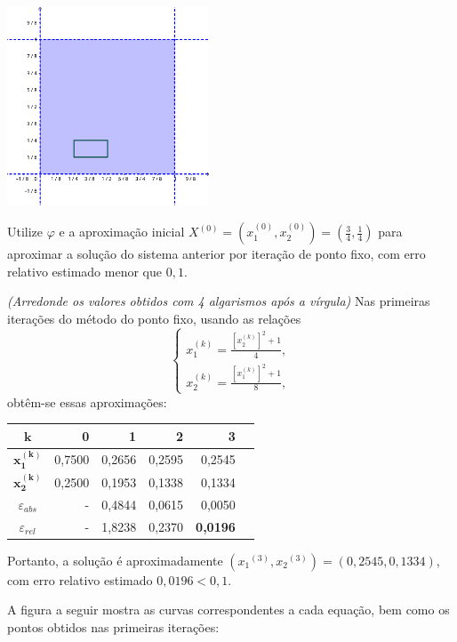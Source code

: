 \documentclass[12pt,a4paper]{article}
\begin{document}
\begin{ExerciseList}
\begin{center}
  \includegraphics[width=6.0cm]{img/5-sistema-não-linear-2x2-iteração-ponto-fixo.pdf}
\end{center}

\Exercise[title={2,0}] Utilize $\varphi$ e a aproximação inicial $X^{(0)}=(x_1^{(0)}, x_2^{(0)}) = (\frac{3}{4}, \frac{1}{4})$ para aproximar a solução do sistema anterior por iteração de ponto fixo, com erro relativo estimado menor que $0,1$.

{\color{blue} \textit{(Arredonde os valores obtidos com 4 algarismos após a vírgula)}}
\Answer Nas primeiras iterações do método do ponto fixo, usando as relações
\[
\begin{cases}
x_1^{(k)} = \frac{\left[x_2^{(k)}\right]^2+1}{4}, \\
x_2^{(k)} = \frac{\left[x_1^{(k)}\right]^2+1}{8},
\end{cases}
\]
obtêm-se essas aproximações:
\medskip
\begin{center}
\begin{tabular}{crrrrr}
\hline
$\boldsymbol{k}$     & 0 & 1 & 2 & 3\\
\hline
$\boldsymbol{x_1^{(k)}}$ & 0,7500 & 0,2656 & 0,2595 & 0,2545 \\
$\boldsymbol{x_2^{(k)}}$ & 0,2500 & 0,1953 & 0,1338 & 0,1334 \\
\hline
$\varepsilon_{abs}$ & - & 0,4844 & 0,0615 & 0,0050 \\
$\varepsilon_{rel}$ & - & 1,8238 & 0,2370 & \textbf{0,0196} \\
\hline
\end{tabular}
\end{center}
\medskip

Portanto, a solução é aproximadamente $({x_1}^{(3)}, {x_2}^{(3)}) = (0,2545, 0,1334)$, com erro relativo estimado $0,0196 < 0,1$.

A figura a seguir mostra as curvas correspondentes a cada equação, bem como os pontos obtidos nas primeiras iterações:


\end{ExerciseList}
\end{document}
